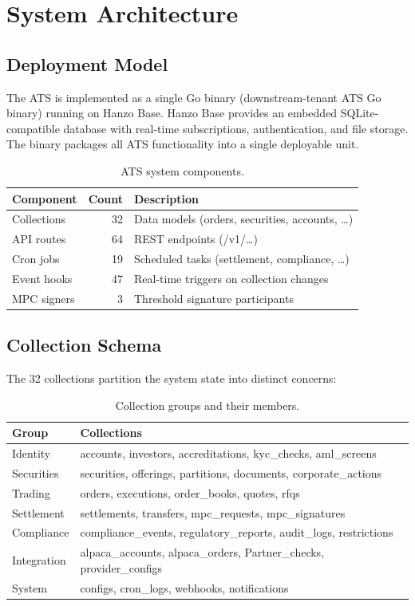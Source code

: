 \section{System Architecture}
\label{sec:architecture}

\subsection{Deployment Model}

The ATS is implemented as a single Go binary (downstream-tenant ATS Go binary) running on Hanzo Base. Hanzo Base provides an embedded SQLite-compatible database with real-time subscriptions, authentication, and file storage. The binary packages all ATS functionality into a single deployable unit.

\begin{table}[H]
\centering
\caption{ATS system components.}
\label{tab:components}
\begin{tabular}{lrl}
\toprule
\textbf{Component} & \textbf{Count} & \textbf{Description} \\
\midrule
Collections & 32 & Data models (orders, securities, accounts, \ldots) \\
API routes & 64 & REST endpoints (/v1/\ldots) \\
Cron jobs & 19 & Scheduled tasks (settlement, compliance, \ldots) \\
Event hooks & 47 & Real-time triggers on collection changes \\
MPC signers & 3 & Threshold signature participants \\
\bottomrule
\end{tabular}
\end{table}

\subsection{Collection Schema}

The 32 collections partition the system state into distinct concerns:

\begin{table}[H]
\centering
\caption{Collection groups and their members.}
\label{tab:collections}
\begin{tabular}{lp{8cm}}
\toprule
\textbf{Group} & \textbf{Collections} \\
\midrule
Identity & accounts, investors, accreditations, kyc\_checks, aml\_screens \\
Securities & securities, offerings, partitions, documents, corporate\_actions \\
Trading & orders, executions, order\_books, quotes, rfqs \\
Settlement & settlements, transfers, mpc\_requests, mpc\_signatures \\
Compliance & compliance\_events, regulatory\_reports, audit\_logs, restrictions \\
Integration & alpaca\_accounts, alpaca\_orders, Partner\_checks, provider\_configs \\
System & configs, cron\_logs, webhooks, notifications \\
\bottomrule
\end{tabular}
\end{table}

